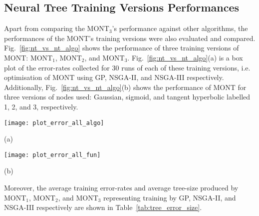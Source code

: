 \documentclass[conference]{IEEEtran}
\begin{document}
\subsection{Neural Tree Training Versions Performances}
\label{sec:res_nt_vs_nt}
Apart from comparing the MONT$_3$'s performance against other algorithms, the performances of the MONT's training versions were also evaluated and compared. Fig.~\ref{fig:nt_vs_nt_algo} shows the performance of three training versions of MONT: MONT$_1$, MONT$_2$, and MONT$_3$. Fig.~\ref{fig:nt_vs_nt_algo}(a) is a box plot of the error-rates collected for 30 runs of each of these training versions, i.e. optimisation of MONT using GP, NSGA-II, and NSGA-III respectively. Additionally, Fig.~\ref{fig:nt_vs_nt_algo}(b) shows the performance of MONT for three versions of nodes used: Gaussian, sigmoid, and tangent hyperbolic labelled 1, 2, and 3, respectively.    
\begin{figure*}
    \centering
    \centerline{\texttt{[image: plot\_error\_all\_algo]}}
    (a)
    \centerline{\texttt{[image: plot\_error\_all\_fun]}}
    (b)
    \caption{Performance of neural tree training versions: (a) Performance of optimisers GP, NSGA-II, and NSGA-III respectively marked 1, 2, and 3 as the subscript of the dataset names. (b) Performance of for activation functions at neural nodes: Gaussian, sigmoid, and tanh respectively marked 1, 2, and 3 as the subscript of dataset names. The median of error-rates is marked in red; the average error-rate is marked in a green triangle.} 
    \label{fig:nt_vs_nt_algo}
\end{figure*}

Moreover, the average training error-rates and average tree-size produced by  MONT$_1$, MONT$_2$, and MONT$_3$ representing training by GP, NSGA-II, and NSGA-III respectively are shown in Table~\ref{tab:tree_error_size}.
\end{document}
